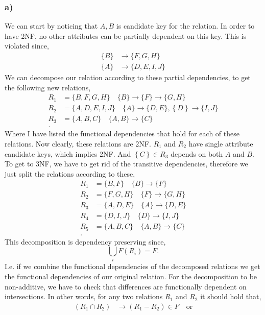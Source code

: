 \documentclass[working, oneside]{../../Preambles/tuftebook}
\begin{document}
\begin{solution}
    \subsubsection*{a)} We can start by noticing that ${A, B}$ is candidate key for the relation. In order to have 2NF, no other attributes can be partially dependent on this key. This is violated since,
\begin{align*}
    \{B\} &\to \{F, G, H\} \\
    \{A\} &\to \{D, E, I, J\}
\end{align*}
We can decompose our relation according to these partial dependencies, to get the following new relations,
\begin{align*}
    R_1 &= \{B, F, G, H\}\quad \{B\} \to \{F\} \to \{G, H\} \\
    R_2 &= \{A, D, E, I, J\} \quad  \{A\} \to \{D, E\}, \left\{ D \right\}  \to \{I,J\}\\
    R_3 &= \{A, B, C\} \quad \{A, B\} \to \{C\} \\
.\end{align*}
Where I have listed the functional dependencies that hold for each of these relations. Now clearly, these relations are 2NF. $R_1$ and $R_2$ have single attribute candidate keys, which implies 2NF. And $\left\{ C \right\} \in R_{3}$ depends on both $A$ and $B$. To get to 3NF, we have to get rid of the transitive dependencies, therefore we just split the relations according to these,
\begin{align*}
    R_1 &=  \{B, F\} \quad \{B\} \to \{F\}\\
    R_2 &=  \{F, G, H\} \quad \{F\} \to \{G, H\}\\
    R_3 &=  \{A, D, E\} \quad \{A\} \to \{D, E\}\\
    R_4 &=  \{D, I, J\} \quad \{D\} \to \{I, J\}\\
    R_5 &=  \{A, B, C\} \quad \{A, B\} \to \{C\}\\
.\end{align*} 
This decomposition is dependency preserving since,
\[
\bigcup_i F\left( R_i \right) = F 
.\]
I.e. if we combine the functional dependencies of the decomposed relations we get the functional dependencies of our original relation. For the decomposition to be non-additive, we have to check that differences are functionally dependent on intersections. In other words, for any two relations $R_1$ and $R_2$ it should hold that,
\begin{align*}
    (R_1 \cap R_2) &\to (R_1 - R_2) \in F \quad \text{or}\\

\end{align*}
\end{solution}
\end{document}
